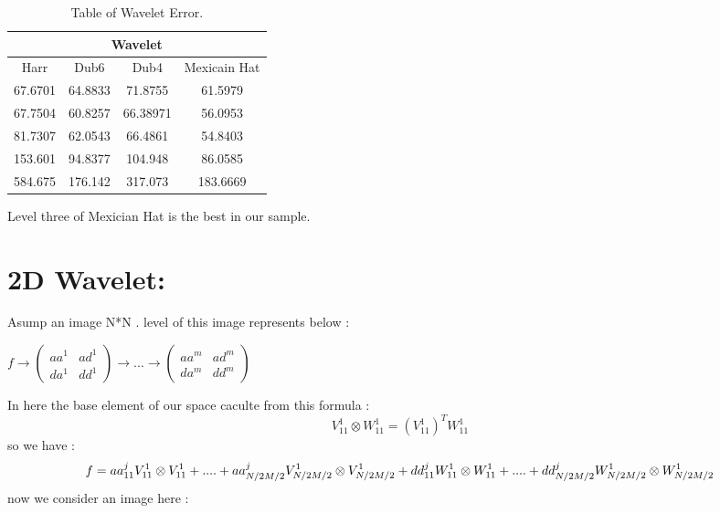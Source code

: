 \documentclass[12pt]{article}
\begin{document}
\begin{table}[h!]
  \begin{center}
    \caption{Table of Wavelet Error.}
    \label{tab:table1}
    \begin{tabular}{c|c|c|c}
      \multicolumn{4}{c}{Wavelet}\\
      \hline
      \multirow{2}{*}{Harr} & \multirow{2}{*}{Dub6} & \multirow{2}{*}{Dub4} & \multirow{2}{*}{Mexicain Hat}\\ 
      & & & \\
      \hline
      \color{green} 67.6701 & 64.8833 & 71.8755 & 61.5979 \\
      67.7504 & \color{green}60.8257 & \color{green}66.38971 & 56.0953 \\
      81.7307 & 62.0543 & 66.4861 & \color{green}54.8403 \\
      153.601 & 94.8377 & 104.948 & 86.0585 \\
      584.675 & 176.142 & 317.073 & 183.6669
      
    \end{tabular}
  \end{center}
\end{table}
Level three of Mexician Hat is the best in our sample.
\newpage

\section{2D Wavelet:}
Asump an image N*N . level of this image represents below :\\
\begin{center}
$f \rightarrow \begin{pmatrix}
aa^1 & ad^1 \\ 
da^1 & dd^1
\end{pmatrix} \rightarrow ... \rightarrow \begin{pmatrix}
aa^m & ad^m \\ 
da^m & dd^m
\end{pmatrix} 
$
\end{center}
In here the base element of our space caculte from this formula :\\
\begin{equation}
V^1_{11} \otimes W^1_{11} = (V^1_{11})^T W^1_{11} 
\end{equation}
so we have :
\begin{equation}
f = aa_{11}^j V^1_{11} \otimes V^1_{11} + .... + aa_{N/2 M/2}^j V^1_{N/2 M/2} \otimes V^1_{N/2 M/2} \\
+ dd_{11}^j W^1_{11} \otimes W^1_{11} + .... + dd_{N/2 M/2}^j W^1_{N/2 M/2} \otimes W^1_{N/2 M/2}
\end{equation}
now we consider an image here : 
\end{document}
